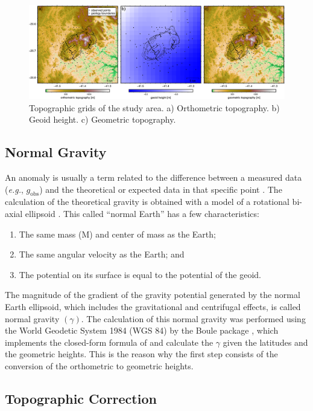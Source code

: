 \begin{figure}[H]
  \centering
  \includegraphics[width=1\linewidth]{figures/heights.png}
  \caption{
    Topographic grids of the study area. a) Orthometric topography. b) Geoid height. c) Geometric topography. 
      }
  \label{heights}
\end{figure}


\subsection{Normal Gravity}
An anomaly is usually a term related to the difference between a measured data (\textit{e.g.}, $g_{\text{obs}}$) and the theoretical or expected data in that specific point \citep{Encyclopedia_solid_earth_geophysics}. The calculation of the theoretical gravity is obtained with a model of a rotational bi-axial ellipsoid \citep{Pasteka2017}. This called ``normal Earth'' has a few characteristics: 

\begin{enumerate}[label=(\roman*)]
    \item The same mass (M) and center of mass as the Earth;
    \item The same angular velocity as the Earth; and
    \item The potential on its surface is equal to the potential of the geoid.
\end{enumerate}
The magnitude of the gradient of the gravity potential generated by the normal Earth ellipsoid, which includes the gravitational and centrifugal effects, is called normal gravity $(\gamma)$. The calculation of this normal gravity was performed using the World Geodetic System 1984 (WGS 84) by the Boule package \citep{Boule2020}, which implements the closed-form formula of \citet{Li2001} and calculate the $\gamma$ given the latitudes and the geometric heights. This is the reason why the first step consists of the conversion of the orthometric to geometric heights. 

\subsection{Topographic Correction}


